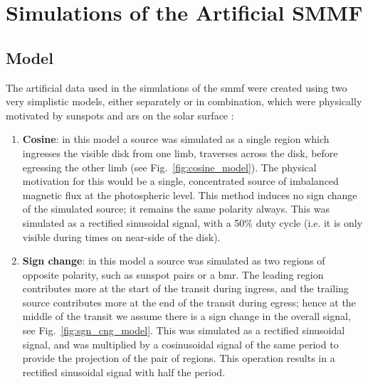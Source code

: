\chapter{Simulations of the Artificial SMMF}\label{app:SMMF_sims}


\section{Model}

The artificial data used in the simulations of the \gls{smmf} were created using two very simplistic models, either separately or in combination, which were physically motivated by sunspots and \glspl{ar} on the solar surface \citep{van_driel-gesztelyi_evolution_2015}:

\begin{enumerate}
	
	\item{{\bf Cosine}: in this model a source was simulated as a single region which ingresses the visible disk from one limb, traverses across the disk, before egressing the other limb (see Fig.~\ref{fig:cosine_model}). The physical motivation for this would be a single, concentrated source of imbalanced magnetic flux at the photospheric level. This method induces no sign change of the simulated source; it remains the same polarity always. This was simulated as a rectified sinusoidal signal, with a 50$\%$ duty cycle (i.e. it is only visible during times on near-side of the disk).}
	
	\item{{\bf Sign change}: in this model a source was simulated as two regions of opposite polarity, such as sunspot pairs or a \gls{bmr}. The leading region contributes more at the start of the transit during ingress, and the trailing source contributes more at the end of the transit during egress; hence at the middle of the transit we assume there is a sign change in the overall signal, see Fig.~\ref{fig:sgn_cng_model}. This was simulated as a rectified sinusoidal signal, and was multiplied by a cosinusoidal signal of the same period to provide the projection of the pair of regions. This operation results in a rectified sinusoidal signal with half the period.}
	
\end{enumerate}


